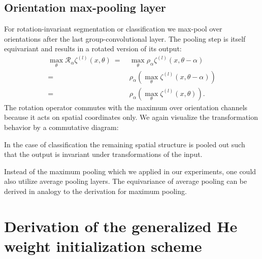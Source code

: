 \documentclass[10pt,twocolumn,letterpaper]{article}
\begin{document}
\subsection{Orientation max-pooling layer}

For rotation-invariant segmentation or classification we max-pool over orientations after the last group-convolutional layer.
The pooling step is itself equivariant and results in a rotated version of its output:
\begin{align*}
	\max_{\theta} \mathcal{R}_\alpha\zeta^{(l)}(x,\theta)\ 
	=\ & \max_{\theta} \rho_\alpha\zeta^{(l)}(x,\theta-\alpha) \\
	=\ & \rho_{\alpha} \left(\max_{\theta} \zeta^{(l)}(x,\theta-\alpha)\right) \\
	=\ & \rho_{\alpha} \left(\max_{\theta} \zeta^{(l)}(x,\theta)\right).
\end{align*}
The rotation operator commutes with the maximum over orientation channels because it acts on spatial coordinates only.
We again visualize the transformation behavior by a commutative diagram:
\begin{center}
\end{center}
In the case of classification the remaining spatial structure is pooled out such that the output is invariant under transformations of the input.

Instead of the maximum pooling which we applied in our experiments, one could also utilize average pooling layers.
The equivariance of average pooling can be derived in analogy to the derivation for maximum pooling.





\section{Derivation of the generalized He weight initialization scheme}\label{apx:HeWeightDeriv}
\end{document}
